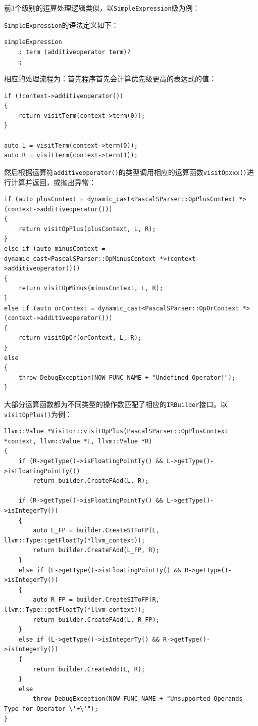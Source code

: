 \documentclass[lang=cn,11pt,a4paper,cite=authornum]{paper}
\begin{document}
前3个级别的运算处理逻辑类似，以\texttt{SimpleExpression}级为例：

\texttt{SimpleExpression}的语法定义如下：

\begin{code}
\begin{verbatim}
simpleExpression
    : term (additiveoperator term)?
    ;
\end{verbatim}
\end{code}

相应的处理流程为：首先程序首先会计算优先级更高的表达式的值：

\begin{code}
\begin{verbatim}
if (!context->additiveoperator())
{
    return visitTerm(context->term(0));
}

auto L = visitTerm(context->term(0));
auto R = visitTerm(context->term(1));
\end{verbatim}
\end{code}

然后根据运算符\texttt{additiveoperator()}的类型调用相应的运算函数\texttt{visitOpxxx()}进行计算并返回，或抛出异常：

\begin{code}
\begin{verbatim}
if (auto plusContext = dynamic_cast<PascalSParser::OpPlusContext *>(context->additiveoperator()))
{
    return visitOpPlus(plusContext, L, R);
}
else if (auto minusContext = dynamic_cast<PascalSParser::OpMinusContext *>(context->additiveoperator()))
{
    return visitOpMinus(minusContext, L, R);
}
else if (auto orContext = dynamic_cast<PascalSParser::OpOrContext *>(context->additiveoperator()))
{
    return visitOpOr(orContext, L, R);
}
else
{
    throw DebugException(NOW_FUNC_NAME + "Undefined Operator!");
}
\end{verbatim}
\end{code}

大部分运算函数都为不同类型的操作数匹配了相应的\texttt{IRBuilder}接口。以\texttt{visitOpPlus()}为例：

\begin{code}
\begin{verbatim}
llvm::Value *Visitor::visitOpPlus(PascalSParser::OpPlusContext *context, llvm::Value *L, llvm::Value *R)
{
    if (R->getType()->isFloatingPointTy() && L->getType()->isFloatingPointTy())
        return builder.CreateFAdd(L, R);

    if (R->getType()->isFloatingPointTy() && L->getType()->isIntegerTy())
    {
        auto L_FP = builder.CreateSIToFP(L, llvm::Type::getFloatTy(*llvm_context));
        return builder.CreateFAdd(L_FP, R);
    }
    else if (L->getType()->isFloatingPointTy() && R->getType()->isIntegerTy())
    {
        auto R_FP = builder.CreateSIToFP(R, llvm::Type::getFloatTy(*llvm_context));
        return builder.CreateFAdd(L, R_FP);
    }
    else if (L->getType()->isIntegerTy() && R->getType()->isIntegerTy())
    {
        return builder.CreateAdd(L, R);
    }
    else
        throw DebugException(NOW_FUNC_NAME + "Unsupported Operands Type for Operator \'+\'");
}
\end{verbatim}
\end{code}
\end{document}
